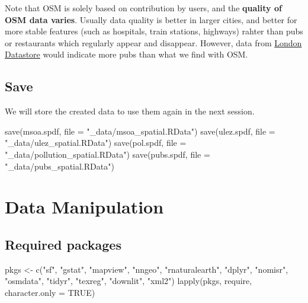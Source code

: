 \documentclass[
  letterpaper,
  DIV=11,
  numbers=noendperiod]{scrreprt}
\newenvironment{Shaded}{\begin{snugshade}}{\end{snugshade}}
\newcommand{\AttributeTok}[1]{\textcolor[rgb]{0.40,0.45,0.13}{#1}}
\newcommand{\ConstantTok}[1]{\textcolor[rgb]{0.56,0.35,0.01}{#1}}
\newcommand{\FunctionTok}[1]{\textcolor[rgb]{0.28,0.35,0.67}{#1}}
\newcommand{\NormalTok}[1]{\textcolor[rgb]{0.00,0.23,0.31}{#1}}
\newcommand{\OtherTok}[1]{\textcolor[rgb]{0.00,0.23,0.31}{#1}}
\newcommand{\StringTok}[1]{\textcolor[rgb]{0.13,0.47,0.30}{#1}}
\begin{document}
Note that OSM is solely based on contribution by users, and the
\textbf{quality of OSM data varies}. Usually data quality is better in
larger cities, and better for more stable features (such as hospitals,
train stations, highways) rahter than pubs or restaurants which
regularly appear and disappear. However, data from
\href{https://data.london.gov.uk/dataset/cultural-infrastructure-map}{London
Datastore} would indicate more pubs than what we find with OSM.

\hypertarget{save}{%
\subsection{Save}\label{save}}

We will store the created data to use them again in the next session.

\begin{Shaded}
\begin{Highlighting}[]
\FunctionTok{save}\NormalTok{(msoa.spdf, }\AttributeTok{file =} \StringTok{"\_data/msoa\_spatial.RData"}\NormalTok{)}
\FunctionTok{save}\NormalTok{(ulez.spdf, }\AttributeTok{file =} \StringTok{"\_data/ulez\_spatial.RData"}\NormalTok{)}
\FunctionTok{save}\NormalTok{(pol.spdf, }\AttributeTok{file =} \StringTok{"\_data/pollution\_spatial.RData"}\NormalTok{)}
\FunctionTok{save}\NormalTok{(pubs.spdf, }\AttributeTok{file =} \StringTok{"\_data/pubs\_spatial.RData"}\NormalTok{)}
\end{Highlighting}
\end{Shaded}

\hypertarget{data-manipulation}{%
\section{Data Manipulation}\label{data-manipulation}}

\hypertarget{required-packages-1}{%
\subsection*{Required packages}\label{required-packages-1}}

\begin{Shaded}
\begin{Highlighting}[]
\NormalTok{pkgs }\OtherTok{\textless{}{-}} \FunctionTok{c}\NormalTok{(}\StringTok{"sf"}\NormalTok{, }\StringTok{"gstat"}\NormalTok{, }\StringTok{"mapview"}\NormalTok{, }\StringTok{"nngeo"}\NormalTok{, }\StringTok{"rnaturalearth"}\NormalTok{, }\StringTok{"dplyr"}\NormalTok{,}
          \StringTok{"nomisr"}\NormalTok{, }\StringTok{"osmdata"}\NormalTok{, }\StringTok{"tidyr"}\NormalTok{, }\StringTok{"texreg"}\NormalTok{, }\StringTok{"downlit"}\NormalTok{, }\StringTok{"xml2"}\NormalTok{) }
\FunctionTok{lapply}\NormalTok{(pkgs, require, }\AttributeTok{character.only =} \ConstantTok{TRUE}\NormalTok{)}
\end{Highlighting}
\end{Shaded}
\end{document}
